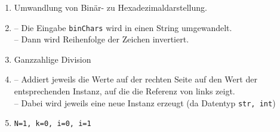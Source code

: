 \begin{enumerate}
	\item Umwandlung von Binär- zu Hexadezimaldarstellung.
	\item -- Die Eingabe \verb|binChars| wird in einen String umgewandelt.\\
	-- Dann wird Reihenfolge der Zeichen invertiert.
	\item Ganzzahlige Division
	\item -- Addiert jeweils die Werte auf der rechten Seite auf den Wert der entsprechenden Instanz, auf die die Referenz von links zeigt.\\
	  -- Dabei wird jeweils eine neue Instanz erzeugt (da Datentyp \texttt{str, int})
	\item \texttt{N=1, k=0, i=0, i=1}
\end{enumerate}